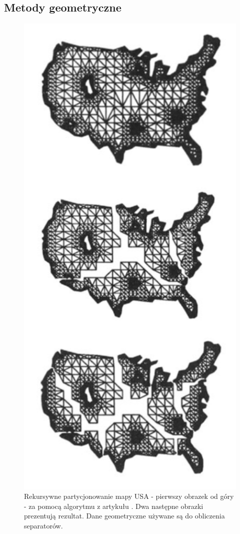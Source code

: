 \newpage
\subsection{Metody geometryczne}

\begin{figure}
    \includegraphics[width=\linewidth]{images/recursive-partitioning}
    \caption{Rekursywne partycjonowanie mapy USA - pierwszy obrazek od góry - za pomocą algorytmu z artykułu \cite{MiTeThVa93}.
    Dwa następne obrazki prezentują rezultat. Dane geometryczne używane są do obliczenia separatorów.}
\end{figure}


